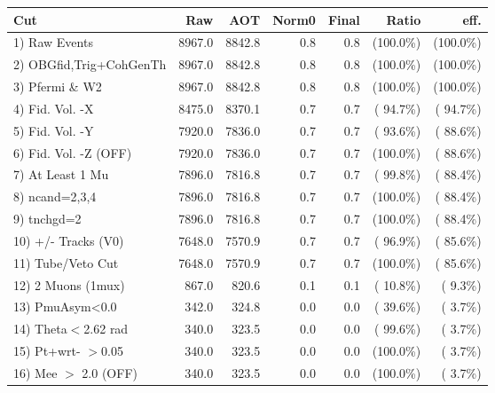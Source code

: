  \begin{table}[h!]\centering
 \begin{tabular}{||l||r|r|r|r|r|r||}
 \hline
 \hline
 Cut & Raw & AOT & Norm0 & Final & Ratio & eff.       \\
 \hline
  1) Raw Events           &       8967.0 &       8842.8 &          0.8 &          0.8 & (100.0\%) & (100.0\%) \\
  2) OBGfid,Trig+CohGenTh &       8967.0 &       8842.8 &          0.8 &          0.8 & (100.0\%) & (100.0\%) \\
  3) Pfermi \& W2         &       8967.0 &       8842.8 &          0.8 &          0.8 & (100.0\%) & (100.0\%) \\
  4) Fid. Vol. -X         &       8475.0 &       8370.1 &          0.7 &          0.7 & ( 94.7\%) & ( 94.7\%) \\
  5) Fid. Vol. -Y         &       7920.0 &       7836.0 &          0.7 &          0.7 & ( 93.6\%) & ( 88.6\%) \\
  6) Fid. Vol. -Z (OFF)   &       7920.0 &       7836.0 &          0.7 &          0.7 & (100.0\%) & ( 88.6\%) \\
  7) At Least 1 Mu        &       7896.0 &       7816.8 &          0.7 &          0.7 & ( 99.8\%) & ( 88.4\%) \\
  8) ncand=2,3,4          &       7896.0 &       7816.8 &          0.7 &          0.7 & (100.0\%) & ( 88.4\%) \\
  9) tnchgd=2             &       7896.0 &       7816.8 &          0.7 &          0.7 & (100.0\%) & ( 88.4\%) \\
 10) +/- Tracks (V0)      &       7648.0 &       7570.9 &          0.7 &          0.7 & ( 96.9\%) & ( 85.6\%) \\
 11) Tube/Veto Cut        &       7648.0 &       7570.9 &          0.7 &          0.7 & (100.0\%) & ( 85.6\%) \\
 12) 2 Muons (1mux)       &        867.0 &        820.6 &          0.1 &          0.1 & ( 10.8\%) & (  9.3\%) \\
 13) PmuAsym<0.0          &        342.0 &        324.8 &          0.0 &          0.0 & ( 39.6\%) & (  3.7\%) \\
 14) Theta$<$2.62 rad     &        340.0 &        323.5 &          0.0 &          0.0 & ( 99.6\%) & (  3.7\%) \\
 15) Pt+wrt- $>$0.05      &        340.0 &        323.5 &          0.0 &          0.0 & (100.0\%) & (  3.7\%) \\
 16) Mee $>$ 2.0  (OFF)   &        340.0 &        323.5 &          0.0 &          0.0 & (100.0\%) & (  3.7\%) \\

\end{tabular}
\end{table}
